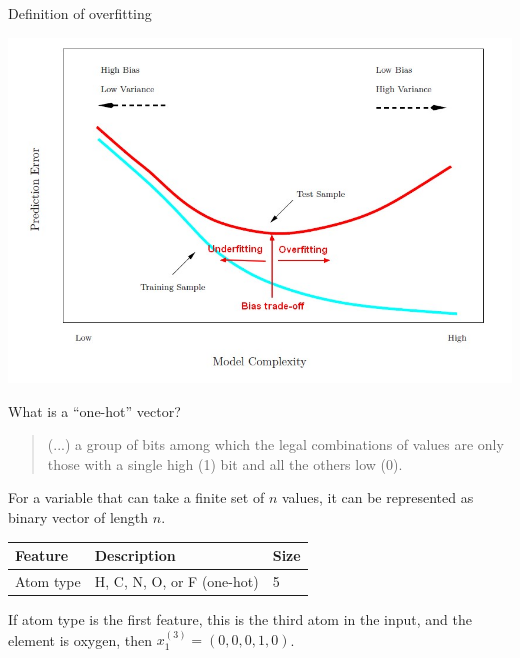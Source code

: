 \documentclass[xetex,compress]{beamer}
\begin{document}
\begin{frame}{Definition of overfitting}
  \begin{center}
    \includegraphics[width=1.00\textwidth]{./figures/model_complexity_error_training_test.jpg}
  \end{center}
\end{frame}

\begin{frame}{What is a ``one-hot'' vector?}
  \begin{quote}
    (...) a group of bits among which the legal combinations of values are only those with a single high (1) bit and all the others low (0).
  \end{quote}
  For a variable that can take a finite set of \(n\) values, it can be represented as binary vector of length \(n\).
  \begin{table}[htbp]
    \centering
    \begin{tabular}{@{}lll@{}}
      \toprule
      Feature & Description & Size \\ \midrule
      Atom type & H, C, N, O, or F (one-hot) & 5 \\ \bottomrule
    \end{tabular}
  \end{table}
  If atom type is the first feature, this is the third atom in the input, and the element is oxygen, then \(x_{1}^{(3)} = (0, 0, 0, 1, 0)\).
\end{frame}
\end{document}
